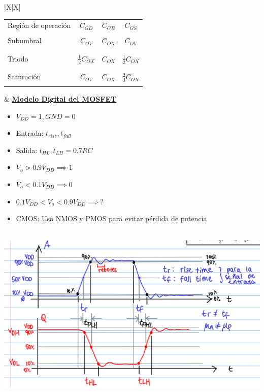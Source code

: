 \documentclass[../main.tex]{subfiles}
\begin{document}
\begin{xltabular}{\textwidth}{|X|X|}
	\begin{center}
		\begin{tabular}{|l|c|c|c|}
			\firsthline
			\multicolumn{4}{|c|}{\textbf{Capacitancias parásitas}}                     \\
			\hline
			Región de operación & $C_{GD}$            & $C_{GB}$ & $C_{GS}$            \\
			\hline
			                    &                     &          &                     \\
			Subumbral           & $C_{OV}$            & $C_{OX}$ & $C_{OV}$            \\
			                    &                     &          &                     \\
			\hline
			                    &                     &          &                     \\
			Triodo              & $\frac{1}{2}C_{OX}$ & $C_{OX}$ & $\frac{1}{2}C_{OX}$ \\
			                    &                     &          &                     \\
			\hline
			                    &                     &          &                     \\
			Saturación          & $C_{OV}$            & $C_{OX}$ & $\frac{2}{3}C_{OX}$ \\
			                    &                     &          &                     \\
			\hline
		\end{tabular}\end{center}
	&
	\underline{\textbf{Modelo Digital del MOSFET}}
	\begin{itemize}
		\item $V_{DD} = 1, GND = 0$
		\item Entrada: $t_{rise}, t_{fall}$
		\item Salida: $t_{HL}, t_{LH}  = 0.7 RC$
		\item $V_o > 0.9 V_{DD} \implies 1$
		\item $V_o < 0.1 V_{DD} \implies 0$
		\item $0.1 V_{DD} < V_o < 0.9 V_{DD} \implies ?$
		\item CMOS: Uso NMOS y PMOS para evitar pérdida de potencia
	\end{itemize}
	\\
	\hline
	\includegraphics[scale=0.35]{assets/digital-timings}

\end{xltabular}
\end{document}
